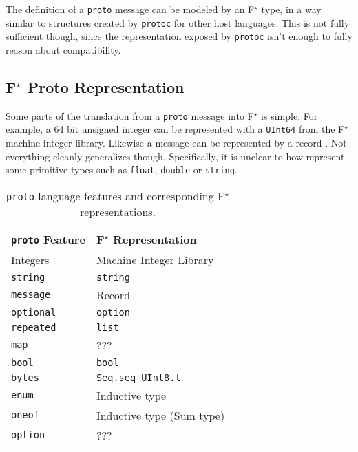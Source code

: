 \documentclass[11pt]{article}
\newcommand{\fstar}{F\(^\star\)}
\begin{document}
The definition of a \texttt{proto} message can be modeled by an \fstar{} type,
in a way similar to structures created by \texttt{protoc} for other host
languages. This is not fully sufficient though, since the representation
exposed by \texttt{protoc} isn't enough to fully reason about compatibility.

\subsection{\fstar{} Proto Representation}

Some parts of the translation from a \texttt{proto} message
\autocite{LanguageGuideProto} into \fstar{} is simple. For example, a 64 bit
unsigned integer can be represented with a \texttt{UInt64} from the \fstar{}
machine integer library. Likewise a message can be represented by a record
\autocite{swamy2023proof}. Not everything cleanly generalizes
though. Specifically, it is unclear to how represent some primitive types such
as \texttt{float}, \texttt{double} or \texttt{string}.

\begin{table}[H]
	\centering
	\begin{tabular}{ll}
		\toprule
		\texttt{proto} Feature & \fstar{} Representation   \\
		\midrule
		Integers               & Machine Integer Library   \\
		\texttt{string}        & \texttt{string}           \\
		\texttt{message}       & Record                    \\
		\texttt{optional}      & \texttt{option}           \\
		\texttt{repeated}      & \texttt{list}             \\
		\texttt{map}           & ???                       \\
		\texttt{bool}          & \texttt{bool}             \\
		\texttt{bytes}         & \texttt{Seq.seq UInt8.t}  \\
		\texttt{enum}          & Inductive type            \\
		\texttt{oneof}         & Inductive type (Sum type) \\
		\texttt{option}        & ???                       \\
		\bottomrule
	\end{tabular}

	\vspace{4mm}
	\caption[]{\texttt{proto} language features and corresponding \fstar{} representations.}
\end{table}
\end{document}
